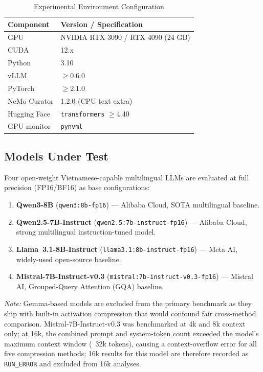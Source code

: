 \documentclass[10pt,twocolumn]{article}
\begin{document}
\begin{table}[h]
\caption{Experimental Environment Configuration}
\label{tab:env}
\centering
\small
\begin{tabular}{@{}ll@{}}
\toprule
\textbf{Component} & \textbf{Version / Specification} \\
\midrule
GPU                & NVIDIA RTX 3090 / RTX 4090 (24 GB) \\
CUDA               & 12.x \\
Python             & 3.10 \\
vLLM               & $\geq$0.6.0 \\
PyTorch            & $\geq$2.1.0 \\
NeMo Curator       & 1.2.0 (CPU text extra) \\
Hugging Face       & \texttt{transformers} $\geq$4.40 \\
GPU monitor        & \texttt{pynvml} \\
\bottomrule
\end{tabular}
\end{table}

\subsection{Models Under Test}

Four open-weight Vietnamese-capable multilingual LLMs are evaluated
at full precision (FP16/BF16) as base configurations:

\begin{enumerate}
  \item \textbf{Qwen3-8B} (\texttt{qwen3:8b-fp16}) ---
    Alibaba Cloud, SOTA multilingual baseline.
  \item \textbf{Qwen2.5-7B-Instruct} (\texttt{qwen2.5:7b-instruct-fp16}) ---
    Alibaba Cloud, strong multilingual instruction-tuned model.
  \item \textbf{Llama~3.1-8B-Instruct} (\texttt{llama3.1:8b-instruct-fp16}) ---
    Meta AI, widely-used open-source baseline.
  \item \textbf{Mistral-7B-Instruct-v0.3} (\texttt{mistral:7b-instruct-v0.3-fp16}) ---
    Mistral AI, Grouped-Query Attention (GQA) baseline.
\end{enumerate}

\noindent\textit{Note:} Gemma-based models are excluded from the
primary benchmark as they ship with built-in activation compression
that would confound fair cross-method comparison.
Mistral-7B-Instruct-v0.3 was benchmarked at 4k and 8k context only;
at 16k, the combined prompt and system-token count exceeded the model's
maximum context window (~32k tokens), causing a context-overflow error
for all five compression methods; 16k results for this model are therefore
recorded as \texttt{RUN\_ERROR} and excluded from 16k analyses.
\end{document}
